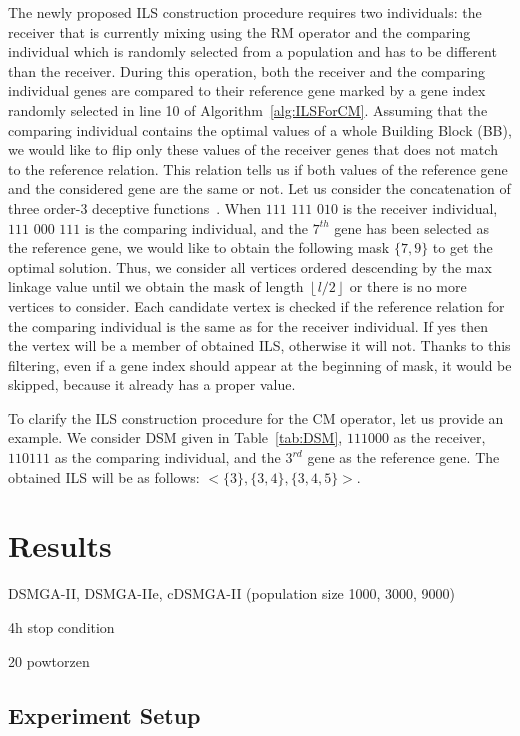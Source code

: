 The newly proposed ILS construction procedure requires two individuals: the receiver that is currently mixing using the RM operator and the comparing individual which is randomly selected from a population and has to be different than the receiver. During this operation, both the receiver and the comparing individual genes are compared to their reference gene marked by a gene index randomly selected in line 10 of Algorithm~\ref{alg:ILSForCM}. Assuming that the comparing individual contains the optimal values of a whole Building Block (BB), we would like to flip only these values of the receiver genes that does not match to the reference relation. This relation tells us if both values of the reference gene and the considered gene are the same or not. Let us consider the concatenation of three order-3 deceptive functions~\cite{decFunc}. When $111$ $111$ $010$ is the receiver individual, $111$ $000$ $111$ is the comparing individual, and the $7^{th}$ gene has been selected as the reference gene, we would like to obtain the following mask $\{7, 9\}$ to get the optimal solution. Thus, we consider all vertices ordered descending by the max linkage value until we obtain the mask of length $\left \lfloor{l/2}\right \rfloor$ or there is no more vertices to consider. Each candidate vertex is checked if the reference relation for the comparing individual is the same as for the receiver individual. If yes then the vertex will be a member of obtained ILS, otherwise it will not. Thanks to this filtering, even if a gene index should appear at the beginning of mask, it would be skipped, because it already has a proper value. 

To clarify the ILS construction procedure for the CM operator, let us provide an example. We consider DSM given in Table~\ref{tab:DSM}, $111000$ as the receiver, $110111$ as the comparing individual, and the $3^{rd}$ gene as the reference gene. The obtained ILS will be as follows: $<$$\{3\}, \{3, 4\}, \{3, 4, 5\}$$>$.

\section{Results}

DSMGA-II, DSMGA-IIe, cDSMGA-II (population size 1000, 3000, 9000)

4h stop condition

20 powtorzen

\subsection{Experiment Setup}

